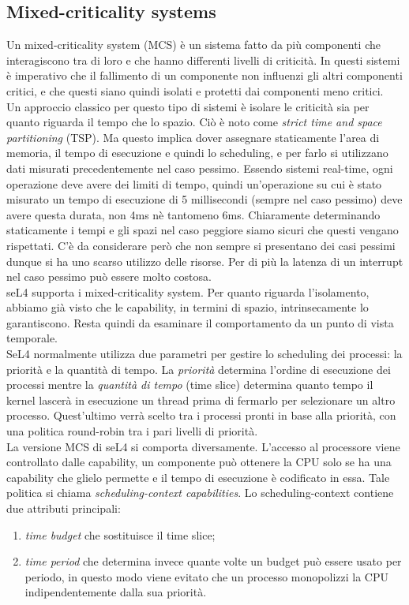 \subsection{Mixed-criticality systems}
Un mixed-criticality system (MCS) è un sistema fatto da più componenti che interagiscono tra di loro e che hanno differenti livelli di criticità. In questi sistemi è imperativo che il fallimento di un componente non influenzi gli altri componenti critici, e che questi siano quindi isolati e protetti dai componenti meno critici.\\
Un approccio classico per questo tipo di sistemi è isolare le criticità sia per quanto riguarda il tempo che lo spazio. Ciò è noto come \textit{strict time and space partitioning} (TSP). Ma questo implica dover assegnare staticamente l'area di memoria, il tempo di esecuzione e quindi lo scheduling, e per farlo si utilizzano dati misurati precedentemente nel caso pessimo. Essendo sistemi real-time, ogni operazione deve avere dei limiti di tempo, quindi un'operazione su cui è stato misurato un tempo di esecuzione di 5 millisecondi (sempre nel caso pessimo) deve avere questa durata, non 4ms nè tantomeno 6ms. Chiaramente determinando staticamente i tempi e gli spazi nel caso peggiore siamo sicuri che questi vengano rispettati. C'è da considerare però che non sempre si presentano dei casi pessimi dunque si ha uno scarso utilizzo delle risorse. Per di più la latenza di un interrupt nel caso pessimo può essere molto costosa.\\
seL4 supporta i mixed-criticality system. Per quanto riguarda l'isolamento, abbiamo già visto che le capability, in termini di spazio, intrinsecamente lo garantiscono. Resta quindi da esaminare il comportamento da un punto di vista temporale.\\
SeL4 normalmente utilizza due parametri per gestire lo scheduling dei processi: la priorità e la quantità di tempo. La \textit{priorità} determina l'ordine di esecuzione dei processi mentre la \textit{quantità di tempo} (time slice) determina quanto tempo il kernel lascerà in esecuzione un thread prima di fermarlo per selezionare un altro processo. Quest'ultimo verrà scelto tra i processi pronti in base alla priorità, con una politica round-robin tra i pari livelli di priorità. \\
La versione MCS di seL4 si comporta diversamente. L'accesso al processore viene controllato dalle capability, un componente può ottenere la CPU solo se ha una capability che glielo permette e il tempo di esecuzione è codificato in essa. Tale politica si chiama \textit{scheduling-context capabilities}. Lo scheduling-context contiene due attributi principali: 
\begin{enumerate}
	\item \textit{time budget} che sostituisce il time slice;
	\item \textit{time period} che determina invece quante volte un budget può essere usato per periodo, in questo modo viene evitato che un processo monopolizzi la CPU indipendentemente dalla sua priorità.
\end{enumerate}

